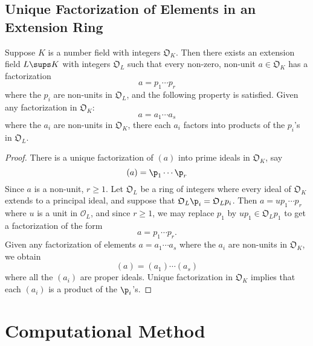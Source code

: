 \subsection{Unique Factorization of Elements in an Extension Ring}
\begin{theorem}
Suppose $K$ is a number field with integers $\mathfrak{O}_K$. Then there exists an extension field $L\sups K$ with integers $\mathfrak{O}_L$ such that every non-zero, non-unit $a\in\mathfrak{O}_K$ has a factorization
\[a=p_1\cdots p_r\]
where the $p_i$ are non-units in $\mathfrak{O}_L$, and the following property is satisfied. Given any factorization in $\mathfrak{O}_K$:
\[a=a_1\cdots a_s\]
where the $a_i$ are non-units in $\mathfrak{O}_K$, there each $a_i$ factors into products of the $p_i$'s in $\mathfrak{O}_L$.
\end{theorem}
\begin{proof}
There is a unique factorization of $(a)$ into prime ideals in $\mathfrak{O}_K$, say
\[(a)=\p_1\cdots\p_r\]
Since $a$ is a non-unit, $r\geq1$. Let $\mathfrak{O}_L$ be a ring of integers where every ideal of $\mathfrak{O}_K$ extends to a principal ideal, and suppose that $\mathfrak{O}_L\p_i=\mathfrak{O}_Lp_i$. Then $a=up_1\cdots p_r$ where $u$ is a unit in $\mathscr{O}_L$, and since $r\geq1$, we may replace $p_1$ by $up_1\in\mathfrak{O}_Lp_1$ to get a factorization of the form
\[a=p_1\cdots p_r.\]
Given any factorization of elements $a=a_1\cdots a_s$ where the $a_i$ are non-units in $\mathfrak{O}_K$, we obtain
\[(a)=(a_1)\cdots(a_s)\]
where all the $(a_i)$ are proper ideals. Unique factorization in $\mathfrak{O}_K$ implies that each $(a_i)$ is a product of the $\p_i$'s.
\end{proof}
\section{Computational Method}
